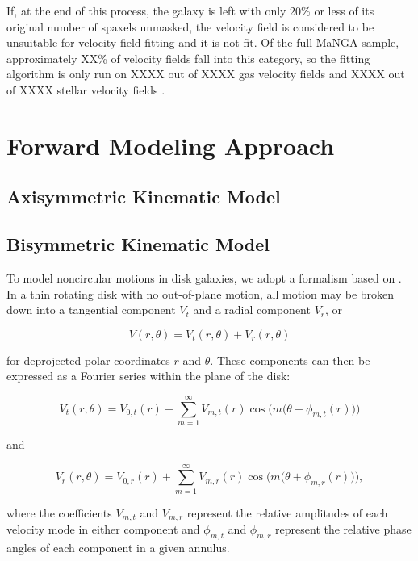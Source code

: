 If, at the end of this process, the galaxy is left with only 20\% or less of its original number of spaxels unmasked, the velocity field is considered to be unsuitable for velocity field fitting and it is not fit. Of the full MaNGA sample, approximately XX\% of velocity fields fall into this category, so the fitting algorithm is only run on XXXX out of XXXX gas velocity fields and XXXX out of XXXX stellar velocity fields .

\section{Forward Modeling Approach}
\label{sec:modeling}

\subsection{Axisymmetric Kinematic Model} \label{sec:axisym}


\subsection{Bisymmetric Kinematic Model} \label{sec:bisym}
To model noncircular motions in disk galaxies, we adopt a formalism based on \cite{spekkens07}. In a thin rotating disk with no out-of-plane motion, all motion may be broken down into a tangential component $V_t$ and a radial component $V_r$, or

\begin{equation} \label{components}
    V(r,\theta) = V_t(r,\theta) + V_r(r,\theta)
\end{equation}

\noindent for deprojected polar coordinates $r$ and $\theta$. These components can then be expressed as a Fourier series within the plane of the disk:

\begin{equation}
    V_t(r, \theta) = V_{0,t}(r) + \sum_{m=1}^\infty V_{m,t}(r) \cos \bigg( m \big(\theta + \phi_{m,t}(r) \big) \bigg)
\end{equation}

and

\begin{equation}
    V_r(r, \theta) = V_{0,r}(r) + \sum_{m=1}^\infty V_{m,r}(r) \cos \bigg( m \big(\theta + \phi_{m,r}(r) \big) \bigg),
\end{equation}

\noindent where the coefficients $V_{m,t}$ and $V_{m,r}$ represent the relative amplitudes of each velocity mode in either component and $\phi_{m,t}$ and $\phi_{m,r}$ represent the relative phase angles of each component in a given annulus. 

